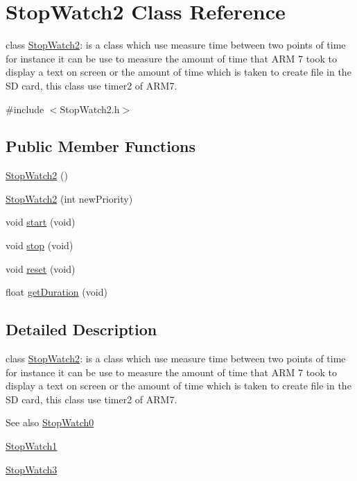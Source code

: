 \hypertarget{class_stop_watch2}{
\section{StopWatch2 Class Reference}
\label{d3/db8/class_stop_watch2}
}


class \hyperlink{class_stop_watch2}{StopWatch2}: is a class which use measure time between two points of time for instance it can be use to measure the amount of time that ARM 7 took to display a text on screen or the amount of time which is taken to create file in the SD card, this class use timer2 of ARM7.  




{\ttfamily \#include $<$StopWatch2.h$>$}

\subsection*{Public Member Functions}
\begin{DoxyCompactItemize}
\item 
\hyperlink{class_stop_watch2_ab106264849ec08dab55b0bea3174130e}{StopWatch2} ()
\item 
\hyperlink{class_stop_watch2_a307210caa6a62c35a5261b30a2bdf094}{StopWatch2} (int newPriority)
\item 
void \hyperlink{class_stop_watch2_a29fb45d9597bccfa6d63f93482436c36}{start} (void)
\item 
void \hyperlink{class_stop_watch2_a15919995d29787101992c7bdd97f1e74}{stop} (void)
\item 
void \hyperlink{class_stop_watch2_a160723a656745e86a638f23185894a79}{reset} (void)
\item 
float \hyperlink{class_stop_watch2_a10d27376c0b0d3a52d0ec874a89df9ad}{getDuration} (void)
\end{DoxyCompactItemize}


\subsection{Detailed Description}
class \hyperlink{class_stop_watch2}{StopWatch2}: is a class which use measure time between two points of time for instance it can be use to measure the amount of time that ARM 7 took to display a text on screen or the amount of time which is taken to create file in the SD card, this class use timer2 of ARM7. 

\begin{DoxySeeAlso}{See also}
\hyperlink{class_stop_watch0}{StopWatch0} 

\hyperlink{class_stop_watch1}{StopWatch1} 

\hyperlink{class_stop_watch3}{StopWatch3} 
\end{DoxySeeAlso}


